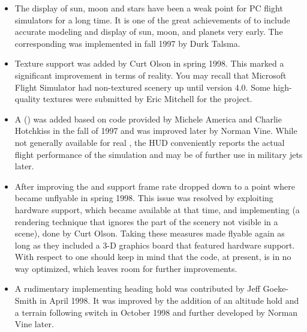 \begin{itemize}

\item The display of sun, moon and stars have been a weak point for PC flight simulators
 for a long time. It is one of the great achievements of \FlightGear{} to include accurate modeling
 and display of sun, moon, and planets very early. The corresponding 
 was implemented in fall 1997 by Durk Talsma.

\item Texture support was added by Curt
Olson in spring 1998. This marked a
 significant improvement in terms of reality. You may recall that Microsoft Flight Simulator had
 non-textured scenery up until version 4.0. Some high-quality
 textures were submitted by Eric Mitchell
  for the \FlightGear{} project.

\item A  () was added based on code
 provided by Michele America and
 Charlie Hotch\-kiss in the fall of 1997 and was improved
 later by Norman Vine. While not generally available for real , the HUD
 conveniently reports the actual flight performance of the simulation and may be of further use
 in military jets later.

\item After improving the  and
 support  frame rate dropped down to a point where
\FlightGear{} became
 unflyable in spring 1998. This issue was resolved by exploiting hardware 
  support, which became available at that time, and implementing
   (a rendering technique that ignores the
 part of the scenery not visible in a scene), done by Curt Olson.
 Taking these measures made \FlightGear{} flyable again as long as they included a 3-D graphics board that featured
 hardware  support. With respect to  one should keep
 in mind that the code, at present, is in no way optimized, which leaves room for further
 improvements.

\item A rudimentary  implementing heading hold was
contributed by Jeff Goeke-Smith in April 1998. It was improved
by the addition of an altitude hold and a terrain following switch in October 1998 and
further developed by Norman Vine later.


\end{itemize}
